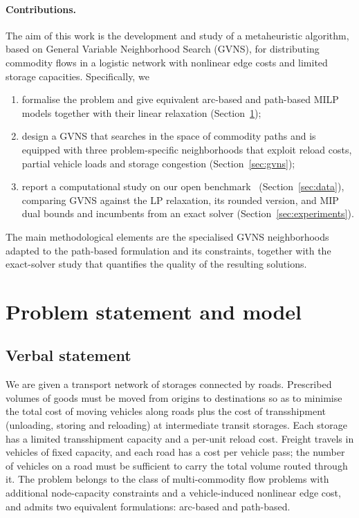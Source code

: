 \documentclass[runningheads]{llncs}
\begin{document}
\paragraph{Contributions.} The aim of this work is the development and study
of a metaheuristic algorithm, based on General Variable Neighborhood Search
(GVNS), for distributing commodity flows in a logistic network with nonlinear
edge costs and limited storage capacities. Specifically, we
\begin{enumerate}[leftmargin=1.4em,itemsep=1pt,topsep=2pt]
\item formalise the problem and give equivalent arc-based and path-based MILP
      models together with their linear relaxation (Section~\ref{sec:model});
\item design a GVNS that searches in the space of commodity paths and is
      equipped with three problem-specific neighborhoods that exploit reload
      costs, partial vehicle loads and storage congestion
      (Section~\ref{sec:gvns});
\item report a computational study on our open benchmark~\cite{benchmark}
      (Section~\ref{sec:data}), comparing GVNS
      against the LP relaxation, its rounded version, and MIP dual bounds and
      incumbents from an exact solver
      (Section~\ref{sec:experiments}).
\end{enumerate}
The main methodological elements are the specialised GVNS neighborhoods adapted
to the path-based formulation and its constraints, together with the
exact-solver study that quantifies the quality of the resulting solutions.

\section{Problem statement and model}
\label{sec:model}

\subsection{Verbal statement}
We are given a transport network of storages connected by roads. Prescribed
volumes of goods must be moved from origins to destinations so as to minimise
the total cost of moving vehicles along roads plus the cost of transshipment
(unloading, storing and reloading) at intermediate transit storages. Each
storage has a limited transshipment capacity and a per-unit reload cost.
Freight travels in vehicles of fixed capacity, and each road has a cost per
vehicle pass; the number of vehicles on a road must be sufficient to carry the
total volume routed through it. The problem belongs to the class of
multi-commodity flow problems with additional node-capacity constraints and a
vehicle-induced nonlinear edge cost, and admits two equivalent formulations:
arc-based and path-based.
\end{document}
